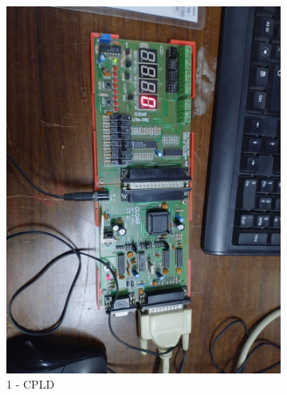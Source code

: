 \begin{center}\begin{figure}[h!]
\centering
\begin{subfigure}[b]{0.45\linewidth}
\includegraphics[width=\linewidth]{./imagenes/0CPLD.jpg}
\caption{1 - CPLD}
\label{fig:westminster_lateral}
\end{subfigure}
\begin{subfigure}[b]{0.45\linewidth}

\end{subfigure}
\end{figure}
\end{center}
